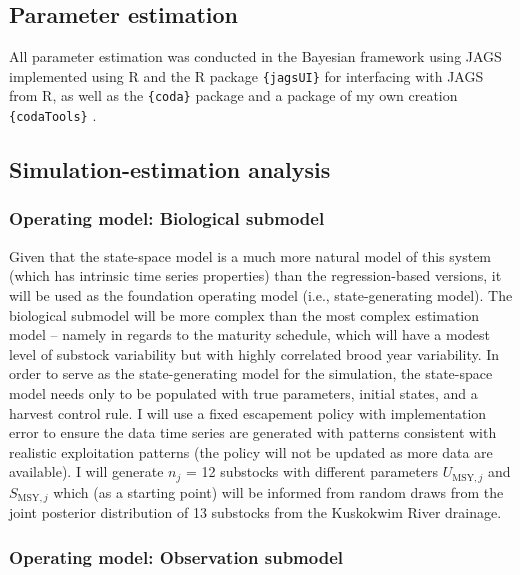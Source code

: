 \documentclass[12pt,]{book}
\theoremstyle{definition}
\theoremstyle{definition}
\theoremstyle{definition}
\theoremstyle{remark}
\begin{document}
\subsection{Parameter estimation}\label{parameter-estimation}

All parameter estimation was conducted in the Bayesian framework using
JAGS \citep{plummer-2017} implemented using R \citep{r-cite} and the R
package \texttt{\{jagsUI\}} \citep{r-jagsUI} for interfacing with JAGS
from R, as well as the \texttt{\{coda\}} \citep{r-coda} package and a
package of my own creation \texttt{\{codaTools\}} \citep{r-codaTools}.

\subsection{Simulation-estimation
analysis}\label{simulation-estimation-analysis}

\subsubsection{Operating model: Biological
submodel}\label{operating-model-biological-submodel}

Given that the state-space model is a much more natural model of this
system (which has intrinsic time series properties) than the
regression-based versions, it will be used as the foundation operating
model (i.e., state-generating model). The biological submodel will be
more complex than the most complex estimation model -- namely in regards
to the maturity schedule, which will have a modest level of substock
variability but with highly correlated brood year variability. In order
to serve as the state-generating model for the simulation, the
state-space model needs only to be populated with true parameters,
initial states, and a harvest control rule. I will use a fixed
escapement policy with implementation error to ensure the data time
series are generated with patterns consistent with realistic
exploitation patterns (the policy will not be updated as more data are
available). I will generate \(n_j\) = 12 substocks with different
parameters \(U_{\text{MSY},j}\) and \(S_{\text{MSY},j}\) which (as a
starting point) will be informed from random draws from the joint
posterior distribution of 13 substocks from the Kuskokwim River
drainage.

\subsubsection{Operating model: Observation
submodel}\label{operating-model-observation-submodel}
\end{document}
